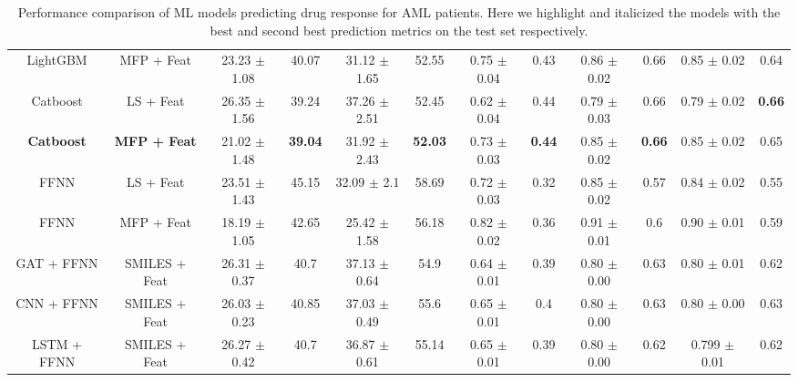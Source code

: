 \documentclass[pdflatex,sn-mathphys-num]{sn-jnl}%
\theoremstyle{thmstyleone}%
\theoremstyle{thmstyletwo}%
\theoremstyle{thmstylethree}%
\begin{document}
\begin{table}[!ht]
{\begin{tabular}{|c|c|c|c|c|c|c|c|c|c|c|c|}
    LightGBM & MFP + Feat & 23.23 $\pm$ 1.08 & 40.07 & 31.12 $\pm$ 1.65 & 52.55 & 0.75 $\pm$ 0.04 & 0.43 & 0.86 $\pm$ 0.02 & 0.66 & 0.85 $\pm$ 0.02 & 0.64 \\
    Catboost & LS + Feat & 26.35 $\pm$ 1.56 & 39.24 & 37.26 $\pm$ 2.51 & 52.45 & 0.62 $\pm$ 0.04 & 0.44 & 0.79 $\pm$ 0.03 & 0.66 & 0.79 $\pm$ 0.02 & \textbf{0.66} \\
    \textbf{Catboost} & \textbf{MFP + Feat} & 21.02 $\pm$ 1.48 & \textbf{39.04} & 31.92 $\pm$ 2.43 & \textbf{52.03} & 0.73 $\pm$ 0.03 & \textbf{0.44} & 0.85 $\pm$ 0.02 & \textbf{0.66} & 0.85 $\pm$ 0.02 & 0.65 \\
    FFNN & LS + Feat & 23.51 $\pm$ 1.43 & 45.15 & 32.09 $\pm$ 2.1 & 58.69 & 0.72 $\pm$ 0.03 & 0.32 & 0.85 $\pm$ 0.02 & 0.57 & 0.84 $\pm$ 0.02 & 0.55 \\
    FFNN & MFP + Feat & 18.19 $\pm$ 1.05 & 42.65 & 25.42 $\pm$ 1.58 & 56.18 & 0.82 $\pm$ 0.02 & 0.36 & 0.91 $\pm$ 0.01 & 0.6 & 0.90 $\pm$ 0.01 & 0.59 \\
    GAT + FFNN & SMILES + Feat & 26.31 $\pm$ 0.37 & 40.7 & 37.13 $\pm$ 0.64 & 54.9 & 0.64 $\pm$ 0.01 & 0.39 & 0.80 $\pm$ 0.00 & 0.63 & 0.80 $\pm$ 0.01 & 0.62 \\
    CNN + FFNN & SMILES + Feat & 26.03 $\pm$ 0.23 & 40.85 & 37.03 $\pm$ 0.49 & 55.6 & 0.65 $\pm$ 0.01 & 0.4 & 0.80 $\pm$ 0.00 & 0.63 & 0.80 $\pm$ 0.00 & 0.63 \\
    LSTM + FFNN & SMILES + Feat & 26.27 $\pm$ 0.42 & 40.7 & 36.87 $\pm$ 0.61 & 55.14 & 0.65 $\pm$ 0.01 & 0.39 & 0.80 $\pm$ 0.00 & 0.62 & 0.799 $\pm$ 0.01 & 0.62 \\
    \hline 
    \end{tabular}
    }
    \caption{Performance comparison of ML models predicting drug response for AML patients. Here we highlight and italicized the models with the best and second best prediction metrics on the test set respectively.}
    \label{table:t1}
\end{table}
\end{document}

